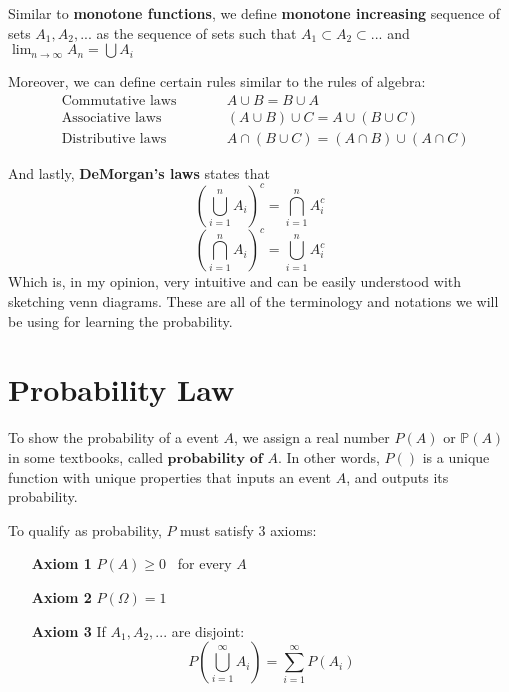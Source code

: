 Similar to \textbf{monotone functions}, we define \textbf{monotone increasing} sequence of sets $A_1,A_2,...$ as the sequence of sets such that $A_1 \subset A_2 \subset...$ and $\lim_{n \rightarrow \infty} A_n = \bigcup A_i$

\par

Moreover, we can define certain rules similar to the rules of algebra:
$$\begin{aligned}
    &\text{Commutative laws} \qquad  &&A \cup B = B \cup A \\
    &\text{Associative laws} \qquad  &&(A \cup B) \cup C = A \cup (B \cup C) \\
    &\text{Distributive laws} \qquad &&A \cap (B \cup C) = (A \cap B) \cup (A \cap C)
\end{aligned}$$

\par

And lastly, \textbf{DeMorgan's laws} states that
$$ \left( \bigcup_{i=1}^n A_i \right) ^c = \bigcap_{i=1}^n A_i^c $$
$$ \left( \bigcap_{i=1}^n A_i \right) ^c = \bigcup_{i=1}^n A_i^c $$
Which is, in my opinion, very intuitive and can be easily understood with sketching venn diagrams.
These are all of the terminology and notations we will be using for learning the probability.









\section{Probability Law}
To show the probability of a event $A$, we assign a real number $P(A)$ or $\mathbb{P}(A)$ in some textbooks, called $\textbf{probability of $A$}$. In other words, $P()$ is a unique function with unique properties that inputs an event $A$, and outputs its probability.
\par 
To qualify as probability, $P$ must satisfy $3$ axioms:
\begin{itemize}
    \item[\textbf{Axiom 1}] $P(A) \ge 0$ \ for every $A$
    \item[\textbf{Axiom 2}] $P(\Omega)=1$
    \item[\textbf{Axiom 3}] If $A_1,A_2,...$ are disjoint: 
    $$P \left( \bigcup^{\infty}_{i=1} A_i \right)= \sum^{\infty}_{i=1}P(A_i) $$
\end{itemize}

